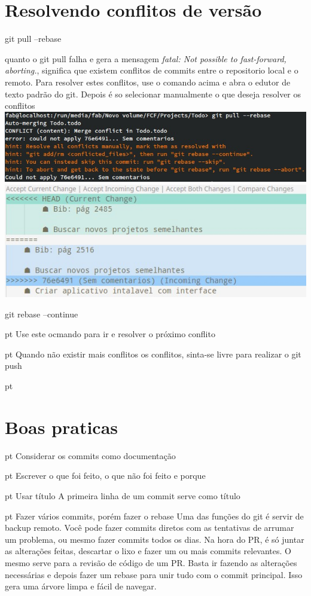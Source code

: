 \section{Resolvendo conflitos de versão}

git pull --rebase

quanto o git pull falha e gera a mensagem \textit{fatal: Not possible to fast-forward, aborting.}, significa que existem conflitos de commits entre o repositorio local e o remoto. Para resolver estes conflitos, use o comando acima e abra o edutor de texto padrão do git. Depois é so selecionar manualmente o que deseja resolver os conflitos
\includegraphics{img_erro_auto_mergeing.jpg}
\includegraphics{img_erro_auto_mergeing_editor.jpg}

git rebase --continue

pt Use este ocmando para ir e resolver o próximo conflito

pt Quando não existir mais conflitos os conflitos, sinta-se livre para realizar o git push

pt \section{Boas praticas}

pt Considerar os commits como documentação

pt Escrever o que foi feito, o que não foi feito e porque 

pt Usar título A primeira linha de um commit serve como título

pt Fazer vários commits, porém fazer o rebase Uma das funções do git é servir de backup remoto. Você pode fazer commits diretos com as tentativas de arrumar um problema, ou mesmo fazer commits todos os dias. Na hora do PR, é só juntar as alterações feitas, descartar o lixo e fazer um ou mais commits relevantes. O mesmo serve para a revisão de código de um PR. Basta ir fazendo as alterações necessárias e depois fazer um rebase para unir tudo com o commit principal. Isso gera uma árvore limpa e fácil de navegar. 

